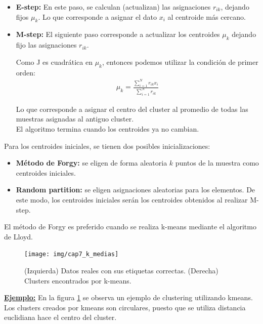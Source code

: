 \begin{itemize}
    \item \textbf{E-step:} En este paso, se calculan (actualizan) las asignaciones $r_{ik}$, dejando fijos $\mu_k$. Lo que corresponde a asignar el dato $x_i$ al centroide más cercano.
    \item \textbf{M-step:} El siguiente paso corresponde a actualizar los centroides $\mu_k$ dejando fijo las asignaciones $r_{ik}$.
    
    Como J es cuadrática en $\mu_k$, entonces podemos utilizar la condición de primer orden:
    \begin{align}
        \mu_k = \frac{\sum_{i=1}^N r_{ik}x_i}{\sum_{i=1}^N r_{ik}}
    \end{align}
    
    Lo que corresponde a asignar el centro del cluster al promedio de todas las muestras asignadas al antiguo cluster.\\
    
    El algoritmo termina cuando los centroides ya no cambian.
\end{itemize}


Para los centroides iniciales, se tienen dos posibles inicializaciones:

\begin{itemize}
	\item \textbf{Método de Forgy:} se eligen de forma aleatoria $k$ puntos de la muestra como centroides iniciales.
	\item \textbf{Random partition:} se eligen asignaciones aleatorias para los elementos. De este modo, los centroides iniciales serán los centroides obtenidos al realizar M-step.
\end{itemize}

El método de Forgy es preferido cuando se realiza k-means mediante el algoritmo de Lloyd.\\


\begin{figure}[h]
  \centering
  \texttt{[image: img/cap7\_k\_medias]}
  \caption{(Izquierda) Datos reales con sus etiquetas correctas. (Derecha) Clusters encontrados por k-means.}
  \label{fig:kmeans}
\end{figure}

\underline{\textbf{Ejemplo:}} En la figura \ref{fig:kmeans} se observa un ejemplo de clustering utilizando kmeans. Los clusters creados por kmeans son circulares, puesto que se utiliza distancia euclidiana hace el centro del cluster.\\


